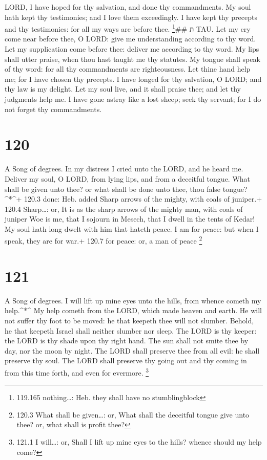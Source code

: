 LORD, I have hoped for thy salvation, and done thy commandments.
 My soul hath kept thy testimonies; and I love them
exceedingly.  I have kept thy precepts and thy
testimonies: for all my ways are before thee. \footnote{119.165
  nothing\ldots: Heb. they shall have no stumblingblock}\#\# ת TAU.
 Let my cry come near before thee, O LORD: give me
understanding according to thy word.  Let my supplication
come before thee: deliver me according to thy word.  My
lips shall utter praise, when thou hast taught me thy statutes.
 My tongue shall speak of thy word: for all thy
commandments are righteousness.  Let thine hand help me;
for I have chosen thy precepts.  I have longed for thy
salvation, O LORD; and thy law is my delight.  Let my soul
live, and it shall praise thee; and let thy judgments help me.
 I have gone astray like a lost sheep; seek thy servant;
for I do not forget thy commandments.

\hypertarget{section-120}{%
\section{120}\label{section-120}}

A Song of degrees.  In my distress I cried unto the LORD,
and he heard me.  Deliver my soul, O LORD, from lying lips,
and from a deceitful tongue.  What shall be given unto thee?
or what shall be done unto thee, thou false tongue?\^{}*\^{}+ 120.3
done: Heb. added  Sharp arrows of the mighty, with coals of
juniper.+ 120.4 Sharp\ldots: or, It is as the sharp arrows of the mighty
man, with coals of juniper  Woe is me, that I sojourn in
Mesech, that I dwell in the tents of Kedar!  My soul hath
long dwelt with him that hateth peace.  I am for peace: but
when I speak, they are for war.+ 120.7 for peace: or, a man of peace
\footnote{120.3 What shall be given\ldots: or, What shall the deceitful
  tongue give unto thee? or, what shall is profit thee?}

\hypertarget{section-121}{%
\section{121}\label{section-121}}

A Song of degrees.  I will lift up mine eyes unto the hills,
from whence cometh my help.\^{}*\^{}  My help cometh from
the LORD, which made heaven and earth.  He will not suffer
thy foot to be moved: he that keepeth thee will not slumber.
 Behold, he that keepeth Israel shall neither slumber nor
sleep.  The LORD is thy keeper: the LORD is thy shade upon
thy right hand.  The sun shall not smite thee by day, nor
the moon by night.  The LORD shall preserve thee from all
evil: he shall preserve thy soul.  The LORD shall preserve
thy going out and thy coming in from this time forth, and even for
evermore. \footnote{121.1 I will\ldots: or, Shall I lift up mine eyes to
  the hills? whence should my help come?}

